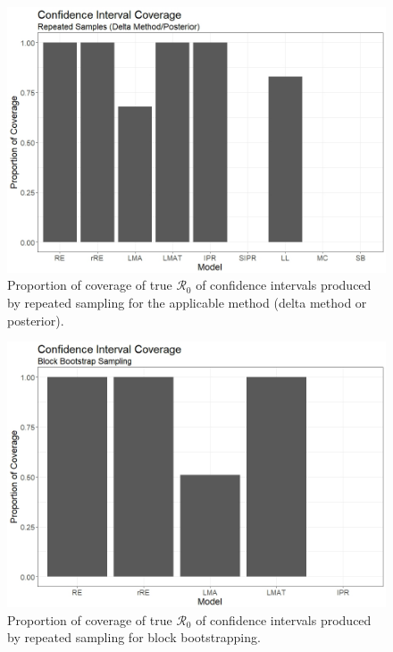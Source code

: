 \documentclass[12pt]{article}
\newcommand{\rr}{\ensuremath{\mathcal{R}_0}}
\begin{document}
\begin{figure}[H]
	\begin{center}
		\includegraphics[scale=0.5]{images/coverage2.jpeg}
		\caption{Proportion of coverage of true $\rr$ of confidence intervals produced by repeated sampling for the applicable method (delta method or posterior).}
		\label{fig:coverage}	
	\end{center}
\end{figure}

\begin{figure}[H]
	\begin{center}
		\includegraphics[scale=0.5]{images/coverage.jpeg}
		\caption{Proportion of coverage of true $\rr$ of confidence intervals produced by repeated sampling for block bootstrapping.}
		\label{fig:coverage}	
	\end{center}
\end{figure}
\end{document}
